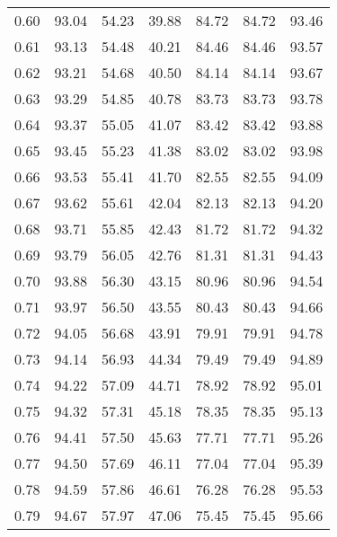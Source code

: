 \begin{tabular}{|c|c|c|c|c|c|c|}
      0.60 &     93.04 &     54.23 &      39.88 &   84.72 &      84.72 &         93.46 \\
      0.61 &     93.13 &     54.48 &      40.21 &   84.46 &      84.46 &         93.57 \\
      0.62 &     93.21 &     54.68 &      40.50 &   84.14 &      84.14 &         93.67 \\
      0.63 &     93.29 &     54.85 &      40.78 &   83.73 &      83.73 &         93.78 \\
      0.64 &     93.37 &     55.05 &      41.07 &   83.42 &      83.42 &         93.88 \\
      0.65 &     93.45 &     55.23 &      41.38 &   83.02 &      83.02 &         93.98 \\
      0.66 &     93.53 &     55.41 &      41.70 &   82.55 &      82.55 &         94.09 \\
      0.67 &     93.62 &     55.61 &      42.04 &   82.13 &      82.13 &         94.20 \\
      0.68 &     93.71 &     55.85 &      42.43 &   81.72 &      81.72 &         94.32 \\
      0.69 &     93.79 &     56.05 &      42.76 &   81.31 &      81.31 &         94.43 \\
      0.70 &     93.88 &     56.30 &      43.15 &   80.96 &      80.96 &         94.54 \\
      0.71 &     93.97 &     56.50 &      43.55 &   80.43 &      80.43 &         94.66 \\
      0.72 &     94.05 &     56.68 &      43.91 &   79.91 &      79.91 &         94.78 \\
      0.73 &     94.14 &     56.93 &      44.34 &   79.49 &      79.49 &         94.89 \\
      0.74 &     94.22 &     57.09 &      44.71 &   78.92 &      78.92 &         95.01 \\
      0.75 &     94.32 &     57.31 &      45.18 &   78.35 &      78.35 &         95.13 \\
      0.76 &     94.41 &     57.50 &      45.63 &   77.71 &      77.71 &         95.26 \\
      0.77 &     94.50 &     57.69 &      46.11 &   77.04 &      77.04 &         95.39 \\
      0.78 &     94.59 &     57.86 &      46.61 &   76.28 &      76.28 &         95.53 \\
      0.79 &     94.67 &     57.97 &      47.06 &   75.45 &      75.45 &         95.66 \\

\end{tabular}

